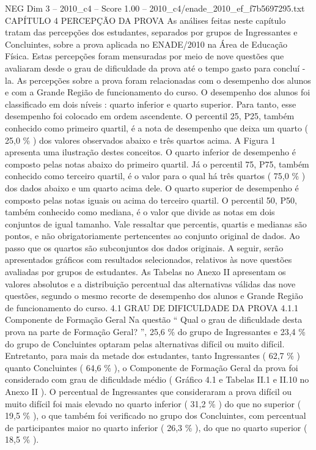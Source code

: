 \begin{textsample}{NEG Dim 3 – 2010\_c4 – Score 1.00 – 2010\_c4/enade\_2010\_ef\_f7b5697295.txt}  \label{ex:f3_neg_117}
CAPÍTULO 4 PERCEPÇÃO DA PROVA As análises feitas neste capítulo tratam das percepções dos estudantes, separados por grupos de Ingressantes e Concluintes, sobre a prova aplicada no ENADE/2010 na Área de Educação Física.
Estas percepções foram mensuradas por meio de nove questões que avaliaram desde o grau de dificuldade da prova até o tempo gasto para concluí -la.
As percepções sobre a prova foram relacionadas com o desempenho dos alunos e com a Grande Região de funcionamento do curso.
O desempenho dos alunos foi classificado em dois níveis : quarto inferior e quarto superior.
Para tanto, esse desempenho foi colocado em ordem ascendente.
O percentil 25, P25, também conhecido como primeiro quartil, é a nota de desempenho que deixa um quarto ( 25,0 \% ) dos valores observados abaixo e três quartos acima.
A Figura 1 apresenta uma ilustração destes conceitos.
O quarto inferior de desempenho é composto pelas notas abaixo do primeiro quartil.
Já o percentil 75, P75, também conhecido como terceiro quartil, é o valor para o qual há três quartos ( 75,0 \% ) dos dados abaixo e um quarto acima dele.
O quarto superior de desempenho é composto pelas notas iguais ou acima do terceiro quartil.
O percentil 50, P50, também conhecido como mediana, é o valor que divide as notas em dois conjuntos de igual tamanho.
Vale ressaltar que percentis, quartis e medianas são pontos, e não obrigatoriamente pertencentes ao conjunto original de dados.
Ao passo que os quartos são subconjuntos dos dados originais.
A seguir, serão apresentados gráficos com resultados selecionados, relativos às nove questões avaliadas por grupos de estudantes.
As Tabelas no Anexo II apresentam os valores absolutos e a distribuição percentual das alternativas válidas das nove questões, segundo o mesmo recorte de desempenho dos alunos e Grande Região de funcionamento do curso. 4.1 GRAU DE DIFICULDADE DA PROVA 4.1.1 Componente de Formação Geral Na questão “ Qual o grau de dificuldade desta prova na parte de Formação Geral? ”, 25,6 \% do grupo de Ingressantes e 23,4 \% do grupo de Concluintes optaram pelas alternativas difícil ou muito difícil.
Entretanto, para mais da metade dos estudantes, tanto Ingressantes ( 62,7 \% ) quanto Concluintes ( 64,6 \% ), o Componente de Formação Geral da prova foi considerado com grau de dificuldade médio ( Gráfico 4.1 e Tabelas II.1 e II.10 no Anexo II ).
O percentual de Ingressantes que consideraram a prova difícil ou muito difícil foi mais elevado no quarto inferior ( 31,2 \% ) do que no superior ( 19,5 \% ), o que também foi verificado no grupo dos Concluintes, com percentual de participantes maior no quarto inferior ( 26,3 \% ), do que no quarto superior ( 18,5 \% ).

\end{textsample}
